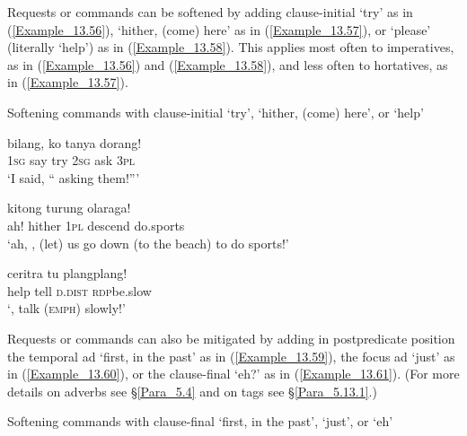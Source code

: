 Requests or commands can be softened by adding clause-initial  ‘try’ as in (\ref{Example_13.56}),  ‘hither, (come) here’ as in (\ref{Example_13.57}), or  ‘please’ (literally ‘help’) as in (\ref{Example_13.58}). This applies most often to imperatives, as in (\ref{Example_13.56}) and (\ref{Example_13.58}), and less often to hortatives, as in (\ref{Example_13.57}).


\begin{styleExampleTitle}
Softening commands with clause-initial  ‘try’,  ‘hither, (come) here’, or  ‘help’
\end{styleExampleTitle}

\ea
\label{Example_13.56}
 {bilang,} {} {ko} {tanya} {dorang!}\\ %
 \textsc{1sg}  say  try  \textsc{2sg}  ask  \textsc{3pl}\\
\glt 
‘I said, `` asking them!''' \textstyleExampleSource{[081025-008-Cv.0076]}
\z

\ea
\label{Example_13.57}
 {} {kitong} {turung} {olaraga!}\\ %
 ah!  hither  \textsc{1pl}  descend  do.sports\\
\glt 
‘ah, , (let) us go down (to the beach) to do sports!’ \textstyleExampleSource{[080917-001-CvNP.0003]}
\z

\ea
\label{Example_13.58}
 {ceritra} {tu} {plang{\Tilde}plang!}\\ %
 help  tell  \textsc{d.dist}  \textsc{rdp}{\Tilde}be.slow\\
 ‘, talk (\textsc{emph}) slowly!’ \textstyleExampleSource{[081015-005-NP.0015]}
\z


Requests or commands can also be mitigated by adding in postpredicate position the temporal ad  ‘first, in the past’ as in (\ref{Example_13.59}), the focus ad  ‘just’ as in (\ref{Example_13.60}), or the clause-final   ‘eh?’ as in (\ref{Example_13.61}). (For more details on adverbs see §\ref{Para_5.4} and on tags see §\ref{Para_5.13.1}.)


\begin{styleExampleTitle}
Softening commands with clause-final  ‘first, in the past’,  ‘just’, or  ‘eh’
\end{styleExampleTitle}

